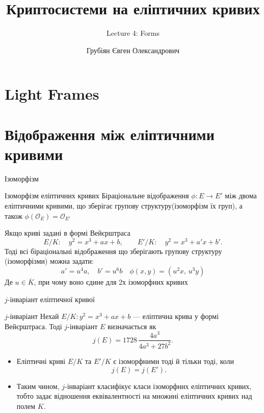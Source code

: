 \documentclass[9pt]{beamer}
\title{Криптосистеми на еліптичних кривих} %
\subtitle{Lecture 4: Forms}
\author{Грубіян Євген Олександрович}
\begin{document}
  \frame{\maketitle}


  \begin{darkframes}
      
    \section{Light Frames}



\section{Відображення між еліптичними кривими}
\begin{frame}{Ізоморфізм}

\begin{block}{Ізоморфізм еліптичних кривих}
    Біраціональне відображення $\phi: E \longrightarrow E'$ між двома еліптичними кривими, що зберігає групову структуру(ізоморфізм їх груп), а також $\phi(\mathcal{O}_E)=\mathcal{O}_{E'}$
\end{block}
Якщо криві задані в формі Вейєрштраса
\[
  E/K: \quad y^2 = x^3 + ax +b, \qquad
  E'/K: \quad y^2 = x^3 + a'x + b'.
  \]
  Тоді всі біраціональні відображення що зберігають групову структуру (ізоморфізми) можна задати:
\[
  a' = u^4 a, \quad b' = u^6 b \quad \phi(x,y) = (u^2 x,\, u^3 y)
  \]
  Де $u \in \overline{K}$, при чому воно єдине для 2х ізоморфних кривих
\end{frame}

\begin{frame}{\(j\)-інваріант еліптичної кривої}
  \begin{block}{\(j\)-інваріант}
    Нехай \(E/K: y^2 = x^3 + ax + b\) --- еліптична крива у формі Вейєрштраса.
    Тоді \(j\)-інваріант \(E\) визначається як
    \[
    j(E) = 1728\,\frac{4a^3}{4a^3+27b^2}.
    \]
  \end{block}
  
  \begin{itemize}
    \item Еліптичні криві \(E/K\) та \(E'/K\) є ізоморфними тоді й тільки тоді, коли
      \[
      j(E) = j(E').
      \]
    \item Таким чином, \(j\)-інваріант класифікує класи ізоморфних еліптичних кривих, тобто задає відношення еквівалентності на множині еліптичних кривих над полем $K$.
  \end{itemize}
\end{frame}



\end{darkframes}
\end{document}
